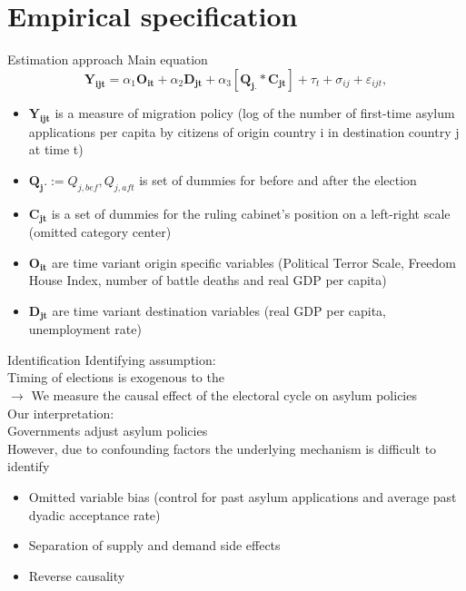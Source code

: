 \documentclass{beamer}
\begin{document}
\section{Empirical specification}
    \begin{frame}{Estimation approach}
Main equation
\begin{equation}
\mathbf{Y_{ijt}} =\alpha_1 \mathbf{O_{it}} + \alpha_2 \mathbf{D_{jt}} + \alpha_3 [\mathbf{Q_{j.}} *  \mathbf{C_{jt}}] + \tau_t + \sigma_{ij} +  \varepsilon_{ijt},
\end{equation}
\vspace{-2ex}
\begin{itemize}
\item $\mathbf{Y_{ijt}}$ is a measure of migration policy (log of the number of first-time asylum applications per capita by citizens of origin country i in destination country j at time t)
\item $\mathbf{Q_j.} := Q_{j,bef}, Q_{j,aft}$ is set of dummies for before and after the election
\item $\mathbf{C_{jt}}$ is a set of dummies for the ruling cabinet's position on a left-right scale (omitted category center)
\item $\mathbf{O_{it}}$ are time variant origin specific variables (Political Terror Scale, Freedom House Index, number of battle deaths and real GDP per capita) 
\item $\mathbf{D_{jt}}$  are time variant destination variables (real GDP per capita, unemployment rate)
\end{itemize}
    \end{frame}
    \begin{frame}{Identification}
Identifying assumption:\\[1ex]
Timing of elections is exogenous to the \\\vspace{.2cm}
$\rightarrow$ We measure the causal effect of the electoral cycle on asylum policies 
\\\vspace{.4cm}
Our interpretation:\\[1ex]
Governments adjust asylum policies 
\\\vspace{.4cm}
However, due to confounding factors the underlying mechanism is difficult to identify\\[1ex] 
\begin{itemize}
\item Omitted variable bias (control for past asylum applications and average past dyadic acceptance rate)\\[1ex] 
\item Separation of supply and demand side effects\\[1ex]
\item Reverse causality
\end{itemize}
	\end{frame}
	
\end{document}
